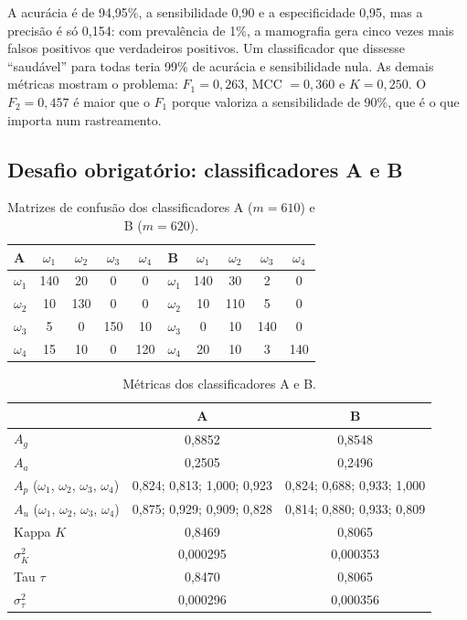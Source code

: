 \documentclass[12pt,a4paper]{article}
\begin{document}
A acurácia é de 94,95\%, a sensibilidade 0,90 e a especificidade 0,95, mas a precisão é só 0,154: com prevalência de 1\%, a mamografia gera cinco vezes mais falsos positivos que verdadeiros positivos. Um classificador que dissesse ``saudável'' para todas teria 99\% de acurácia e sensibilidade nula. As demais métricas mostram o problema: $F_1 = 0{,}263$, MCC $= 0{,}360$ e $K = 0{,}250$. O $F_2 = 0{,}457$ é maior que o $F_1$ porque valoriza a sensibilidade de 90\%, que é o que importa num rastreamento.

\subsection{Desafio obrigatório: classificadores A e B}\label{sec:desafio}

\begin{table}[H]
\centering
\caption{Matrizes de confusão dos classificadores A ($m = 610$) e B ($m = 620$).}
\label{tab:desafio_mc}
\begin{tabular}{l|cccc||l|cccc}
\toprule
A & $\omega_1$ & $\omega_2$ & $\omega_3$ & $\omega_4$ & B & $\omega_1$ & $\omega_2$ & $\omega_3$ & $\omega_4$ \\
\midrule
$\omega_1$ & 140 & 20  & 0   & 0   & $\omega_1$ & 140 & 30  & 2   & 0   \\
$\omega_2$ & 10  & 130 & 0   & 0   & $\omega_2$ & 10  & 110 & 5   & 0   \\
$\omega_3$ & 5   & 0   & 150 & 10  & $\omega_3$ & 0   & 10  & 140 & 0   \\
$\omega_4$ & 15  & 10  & 0   & 120 & $\omega_4$ & 20  & 10  & 3   & 140 \\
\bottomrule
\end{tabular}
\end{table}

\begin{table}[H]
\centering
\caption{Métricas dos classificadores A e B.}
\label{tab:desafio_metricas}
\small
\begin{tabular}{lcc}
\toprule
 & A & B \\
\midrule
$A_g$          & 0,8852 & 0,8548 \\
$A_a$          & 0,2505 & 0,2496 \\
$A_p$ ($\omega_1$, $\omega_2$, $\omega_3$, $\omega_4$) & 0,824; 0,813; 1,000; 0,923 & 0,824; 0,688; 0,933; 1,000 \\
$A_u$ ($\omega_1$, $\omega_2$, $\omega_3$, $\omega_4$) & 0,875; 0,929; 0,909; 0,828 & 0,814; 0,880; 0,933; 0,809 \\
Kappa $K$      & 0,8469 & 0,8065 \\
$\sigma_K^2$   & 0,000295 & 0,000353 \\
Tau $\tau$     & 0,8470 & 0,8065 \\
$\sigma_\tau^2$ & 0,000296 & 0,000356 \\
\bottomrule
\end{tabular}
\end{table}
\end{document}
